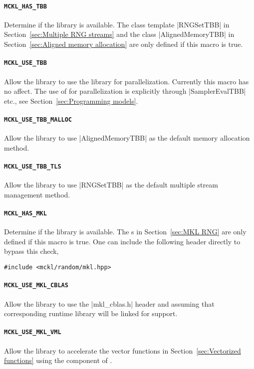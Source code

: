 \paragraph{\texttt{MCKL\_HAS\_TBB}} Determine if the \tbb library is available.
The class template |RNGSetTBB| in Section~\ref{sec:Multiple RNG streams} and
the class |AlignedMemoryTBB| in Section~\ref{sec:Aligned memory allocation} are
only defined if this macro is true.

\paragraph{\texttt{MCKL\_USE\_TBB}} Allow the library to use the \tbb library
for parallelization. Currently this macro has no affect. The use of \tbb for
parallelization is explicitly through |SamplerEvalTBB| etc., see
Section~\ref{sec:Programming models}.

\paragraph{\texttt{MCKL\_USE\_TBB\_MALLOC}} Allow the library to use
|AlignedMemoryTBB| as the default memory allocation method.

\paragraph{\texttt{MCKL\_USE\_TBB\_TLS}} Allow the library to use |RNGSetTBB|
as the default multiple \rng stream management method.

\paragraph{\texttt{MCKL\_HAS\_MKL}} Determine if the \mkl library is available.
The \rng{}s in Section~\ref{sec:MKL RNG} are only defined if this macro is
true. One can include the following header directly to bypass this check,
\begin{Verbatim}
#include <mckl/random/mkl.hpp>
\end{Verbatim}

\paragraph{\texttt{MCKL\_USE\_MKL\_CBLAS}} Allow the library to use the
|mkl_cblas.h| header and assuming that corresponding runtime library will be
linked for \blas support.

\paragraph{\texttt{MCKL\_USE\_MKL\_VML}} Allow the library to accelerate the
vector functions in Section~\ref{sec:Vectorized functions} using the \vml
component of \mkl.

